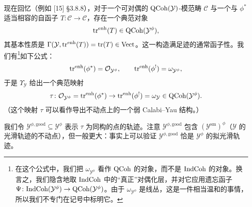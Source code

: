 现在回忆（例如 [15] §3.8.8），对于一个可对偶的 $\mathrm{QCoh}(\mathcal{Y})$-模范畴 $\mathcal{C}$ 与一个与 $\phi^*$ 适当相容的自函子 $T\colon\mathcal{C}\to\mathcal{C}$，存在一个典范对象
\[
  \operatorname{tr}^{\mathrm{enh}}(T)\in\mathrm{QCoh}(\mathcal{Y}^{\phi}),
\]
其基本性质是 $\Gamma(\mathcal{Y},\operatorname{tr}^{\mathrm{enh}}(T))=\operatorname{tr}(T)\in\mathrm{Vect}$。这一构造满足迹的通常函子性。我们有\footnote{在这个公式中，我们把 $\omega_{\mathcal{Y}^{\phi}}$ 看作 $\mathrm{QCoh}$ 的对象，而不是 $\mathrm{IndCoh}$ 的对象。换言之，我们隐含地取 $\mathrm{IndCoh}$ 中的“真正”对偶化层，并对它应用遗忘函子 $\Psi\colon\mathrm{IndCoh}(\mathcal{Y}^{\phi})\to\mathrm{QCoh}(\mathcal{Y}^{\phi})$。由于 $\omega_{\mathcal{Y}^{\phi}}$ 是线丛，这是一件相当温和的事情，所以我们不专门在记号中标明它。}如下公式：
\[
  \operatorname{tr}^{\mathrm{enh}}(\phi^*)=\mathcal{O}_{\mathcal{Y}^{\phi}},\qquad
  \operatorname{tr}^{\mathrm{enh}}(\phi^!)=\omega_{\mathcal{Y}^{\phi}},
\]
于是 $\Upsilon_{\mathcal{Y}}$ 给出一个典范映射
\[
  \tau\colon\mathcal{O}_{\mathcal{Y}^{\phi}}=\operatorname{tr}^{\mathrm{enh}}(\phi^*)\to\operatorname{tr}^{\mathrm{enh}}(\phi^!)=\omega_{\mathcal{Y}}
  \in\mathrm{QCoh}(\mathcal{Y}^{\phi}).
\]
（这个映射 $\tau$ 可以看作导出不动点上的一个弱 Calabi--Yau 结构。）

我们令 $\mathcal{Y}^{\phi,\mathrm{good}}\subseteq\mathcal{Y}^{\phi}$ 表示 $\tau$ 为同构的点的轨迹。注意 $\mathcal{Y}^{\phi,\mathrm{good}}$ 包含 $(\mathcal{Y}^{\mathrm{sm}})^{\phi}$（$\mathcal{Y}$ 的光滑轨迹的不动点），但一般更大：事实上可以验证 $\mathcal{Y}^{\phi,\mathrm{good}}$ 恰是 $\mathcal{Y}^{\phi}$ 的拟光滑轨迹。


